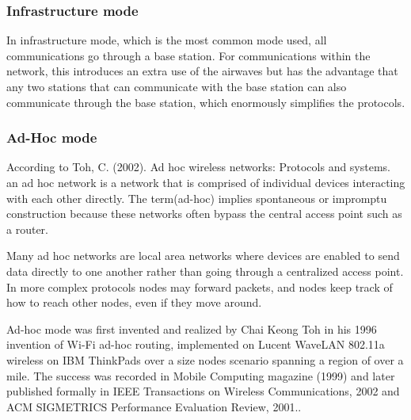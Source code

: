 \vspace{12pt}
\subsubsection{Infrastructure mode}


\vspace{12pt}

In infrastructure mode, which is the most common mode used, all communications go through a base station. For communications within the network, this introduces an extra use of the airwaves but has the advantage that any two stations that can communicate with the base station can also communicate through the base station, which enormously simplifies the protocols.

\vspace{12pt}

\subsubsection{Ad-Hoc mode}


\vspace{12pt}
According to Toh, C. (2002). Ad hoc wireless networks: Protocols and systems. \cite{book_adhoc} an ad hoc network is a network that is comprised of individual devices interacting with each other directly. The term(ad-hoc) implies spontaneous or impromptu construction because these networks often bypass the central access point such as a router.

\vspace{12pt}

Many ad hoc networks are local area networks where devices are enabled to send data directly to one another rather than going through a centralized access point. In more complex protocols nodes may forward packets, and nodes keep track of how to reach other nodes, even if they move around.

\clearpage
\vspace{12pt}

Ad-hoc mode was first invented and realized by Chai Keong Toh in his 1996 invention\cite{book} of Wi-Fi ad-hoc routing, implemented on Lucent WaveLAN 802.11a wireless on IBM ThinkPads over a size nodes scenario spanning a region of over a mile. The success was recorded in Mobile Computing magazine (1999)\cite{book}  and later published formally in IEEE Transactions on Wireless Communications, 2002\cite{book}  and ACM SIGMETRICS Performance Evaluation Review, 2001.\cite{book}.

